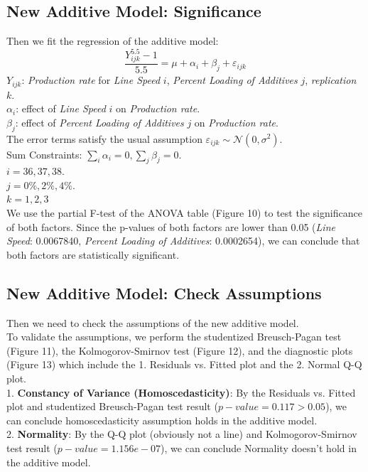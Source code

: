 \documentclass[11pt,a4paper]{article}
\begin{document}
\subsection{New Additive Model: Significance}
Then we fit the regression of the additive model:
$$\frac{Y_{ijk}^{5.5}-1}{5.5}=\mu+\alpha_i+\beta_j+\varepsilon_{ijk}$$
$Y_{ijk}$: \textit{Production rate} for \textit{Line Speed} $i$, \textit{Percent Loading of Additives} $j$, \textit{replication} $k$.\\
$\alpha_i$: effect of \textit{Line Speed} $i$ on \textit{Production rate}.\\
$\beta_j$: effect of \textit{Percent Loading of Additives} $j$ on \textit{Production rate}.\\
The error terms satisfy the usual assumption $\varepsilon_{i j k} \sim \mathcal{N}\left(0, \sigma^{2}\right)$.\\
Sum Constraints: $\sum_{i} \alpha_{i}=0, \sum_{j} \beta_{j}=0$.\\
$i=36,37,38.$\\
$j=0\%,2\%,4\%.$\\
$k=1,2,3$\\

We use the partial F-test of the ANOVA table (Figure 10) to test the significance of both factors. Since the p-values of both factors are lower than 0.05 (\textit{Line Speed}: 0.0067840, \textit{Percent Loading of Additives}: 0.0002654), we can conclude that both factors are statistically significant.


\subsection{New Additive Model: Check Assumptions}
Then we need to check the assumptions of the new additive model.\\
To validate the assumptions, we perform the studentized Breusch-Pagan test (Figure 11), the Kolmogorov-Smirnov test (Figure 12), and the diagnostic plots (Figure 13) which include the 1. Residuals vs. Fitted plot and the 2. Normal Q-Q plot.\\
1. \textbf{Constancy of Variance (Homoscedasticity)}: By the Residuals vs. Fitted plot and studentized Breusch-Pagan test result ($p-value=0.117>0.05$), we can conclude homoscedasticity assumption holds in the additive model.\\
2. \textbf{Normality}: By the Q-Q plot (obviously not a line) and Kolmogorov-Smirnov test result ($p-value=1.156e-07$), we can conclude Normality doesn't hold in the additive model.
\end{document}
